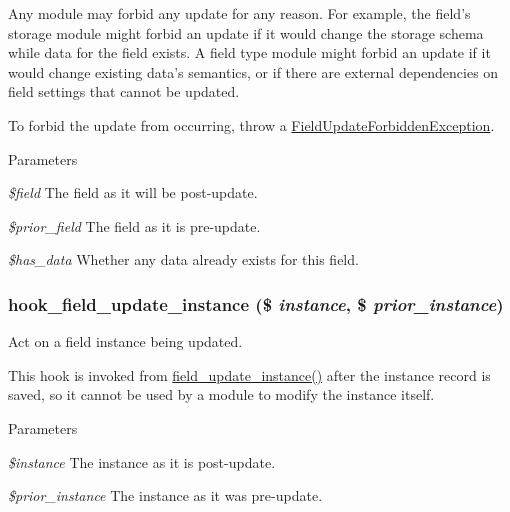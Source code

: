 Any module may forbid any update for any reason. For example, the field's storage module might forbid an update if it would change the storage schema while data for the field exists. A field type module might forbid an update if it would change existing data's semantics, or if there are external dependencies on field settings that cannot be updated.

To forbid the update from occurring, throw a \hyperlink{classFieldUpdateForbiddenException}{FieldUpdateForbiddenException}.


\begin{DoxyParams}{Parameters}
\item[{\em \$field}]The field as it will be post-\/update. \item[{\em \$prior\_\-field}]The field as it is pre-\/update. \item[{\em \$has\_\-data}]Whether any data already exists for this field. \end{DoxyParams}
\hypertarget{group__field__crud_gadac9cbd13f55714dbf8fc2a98227f6e3}{
\subsubsection[{hook\_\-field\_\-update\_\-instance}]{\setlength{\rightskip}{0pt plus 5cm}hook\_\-field\_\-update\_\-instance (\$ {\em instance}, \/  \$ {\em prior\_\-instance})}}
\label{group__field__crud_gadac9cbd13f55714dbf8fc2a98227f6e3}
Act on a field instance being updated.

This hook is invoked from \hyperlink{group__field__crud_ga34a5c5247a19f6732f71aa1d67c1709d}{field\_\-update\_\-instance()} after the instance record is saved, so it cannot be used by a module to modify the instance itself.


\begin{DoxyParams}{Parameters}
\item[{\em \$instance}]The instance as it is post-\/update. \item[{\em \$prior\_\-instance}]The instance as it was pre-\/update. \end{DoxyParams}
